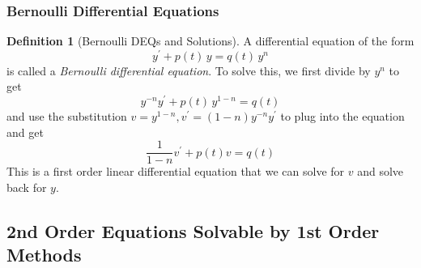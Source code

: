 \documentclass{article}
\theoremstyle{remark}
\theoremstyle{definition}
\newtheorem{definition}{Definition}[section]
\begin{document}
    \subsubsection{Bernoulli Differential Equations}

      \begin{definition}[Bernoulli DEQs and Solutions]
      A differential equation of the form 
      \[y^\prime + p(t)\,y = q(t)\, y^{n}\]
      is called a \textit{Bernoulli differential equation}. To solve this, we first divide by $y^n$ to get
      \[y^{-n} y^\prime + p(t)\,y^{1-n} = q(t)\]
      and use the substitution $v = y^{1-n}, v^\prime = (1-n)y^{-n} y^\prime$ to plug into the equation and get
      \[\frac{1}{1-n} v^\prime + p(t) v = q(t)\]
      This is a first order linear differential equation that we can solve for $v$ and solve back for $y$. 
      \end{definition}

  \subsection{2nd Order Equations Solvable by 1st Order Methods}
\end{document}
